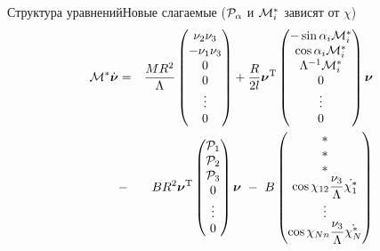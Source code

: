 \documentclass{beamer}
\renewcommand{\vec}[1]{\boldsymbol{\mathbf{#1}}}
\begin{document}
\begin{frame}{Структура уравнений}{Новые слагаемые ($\mathcal{P}_\alpha$ и $\mathcal{M}^*_i$ зависят от $\chi$)}
\vspace{-15pt}
\begin{eqnarray*}\label{eq:full_system}
\M^*\dot{\vec{\nu}} & = & 
\frac{MR^2}{\Lambda}\left(\begin{matrix}
    \nu_2\nu_3\\
    -\nu_1\nu_3\\
    0\\
    0\\
    \vdots
    \\
    0
\end{matrix}\right)
+
\frac{R}{2l}
\vec{\nu}^\mathrm{T}
\left(\begin{matrix}
    -\sin\alpha_i \M^*_i\\
    \cos\alpha_i \M^*_i\\
    \Lambda^{-1}\M^*_i\\
    0\\
    \vdots
    \\
    0
    \end{matrix}
\right)
\vec{\nu}
\\
 & - & BR^2
\vec{\nu}^\mathrm{T}
\left(\begin{matrix}
    \Prhs_1\\
    \Prhs_2\\
    \Prhs_3\\
    0\\
    \vdots
    \\
    0
\end{matrix}\right)
\vec{\nu}
\ - \
B\left(\begin{matrix}
    *\\
    *\\
    *\\
    \cos\chi_{12}\ddfrac{\nu_3}{\Lambda}\dot{\chi_1^*}\\
    \vdots
    \\
    \cos\chi_{Nn}\ddfrac{\nu_3}{\Lambda}\dot{\chi_N^*}
\end{matrix}\right)
\end{eqnarray*}
\end{frame}
\end{document}
